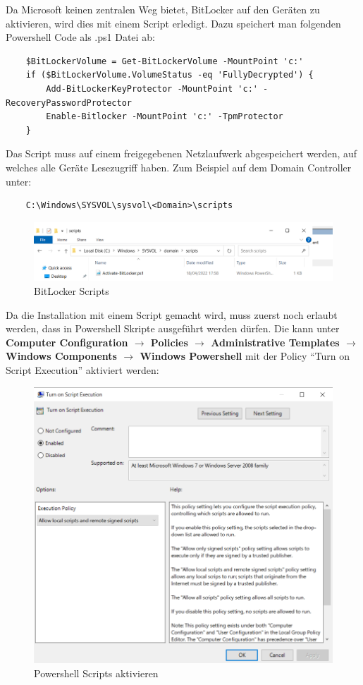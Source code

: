 Da Microsoft keinen zentralen Weg bietet, BitLocker auf den Geräten zu aktivieren, wird dies mit einem Script erledigt.
Dazu speichert man folgenden Powershell Code als .ps1 Datei ab:
\begin{lstlisting}
    $BitLockerVolume = Get-BitLockerVolume -MountPoint 'c:'
    if ($BitLockerVolume.VolumeStatus -eq 'FullyDecrypted') {
        Add-BitLockerKeyProtector -MountPoint 'c:' -RecoveryPasswordProtector
        Enable-Bitlocker -MountPoint 'c:' -TpmProtector
    }
\end{lstlisting}
Das Script muss auf einem freigegebenen Netzlaufwerk abgespeichert werden, auf welches alle Geräte Lesezugriff haben.
Zum Beispiel auf dem Domain Controller unter:
\begin{lstlisting}
    C:\Windows\SYSVOL\sysvol\<Domain>\scripts
\end{lstlisting}
\begin{figure}[H]
    \centering
    \includegraphics[width=\linewidth]{../img/Encryption/activate-bitlocker-script.png}
    \caption{BitLocker Scripts}
\end{figure}

Da die Installation mit einem Script gemacht wird, muss zuerst noch erlaubt werden, dass in Powershell Skripte ausgeführt werden dürfen.
Die kann unter \textbf{Computer Configuration $\rightarrow$ Policies $\rightarrow$ Administrative Templates $\rightarrow$ Windows Components $\rightarrow$ Windows Powershell} mit der Policy ``Turn on Script Execution'' aktiviert werden:
\begin{figure}[H]
    \centering
    \includegraphics[width=\linewidth]{../img/Encryption/powershell-execution.png}
    \caption{Powershell Scripts aktivieren}
\end{figure}

